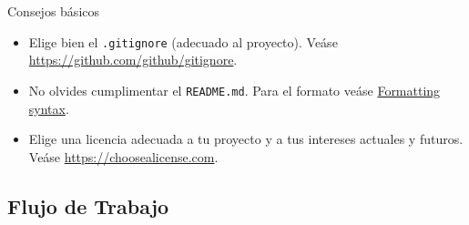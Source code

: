 \documentclass[xcolor={usenames,svgnames,dvipsnames}]{beamer}
\begin{document}
\begin{frame}[label={sec:orga93426a},fragile]{Consejos básicos}
 \begin{itemize}
\item Elige bien el \texttt{.gitignore} (adecuado al proyecto). Veáse \url{https://github.com/github/gitignore}.
\item No olvides cumplimentar el \texttt{README.md}. Para el formato veáse \href{https://help.github.com/articles/basic-writing-and-formatting-syntax/}{Formatting syntax}.
\item Elige una licencia adecuada a tu proyecto y a tus intereses actuales y futuros. Veáse \url{https://choosealicense.com}.
\end{itemize}
\end{frame}


\subsection{Flujo de Trabajo}
\label{sec:orga6b6f34}
\end{document}
